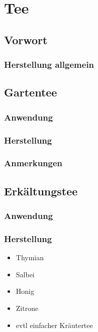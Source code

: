 \chapter{Tee}

\section{Vorwort}

\lipsum[1-5]
\newpage



\subsection{Herstellung allgemein}



\section{Gartentee}

\subsection{Anwendung}

\subsection{Herstellung}

\subsection{Anmerkungen}




\section{Erkältungstee}

\subsection{Anwendung}

\subsection{Herstellung}

\begin{itemize}
	\item Thymian
	\item Salbei
	\item Honig
	\item Zitrone
	\item evtl einfacher Kräutertee
\end{itemize}




